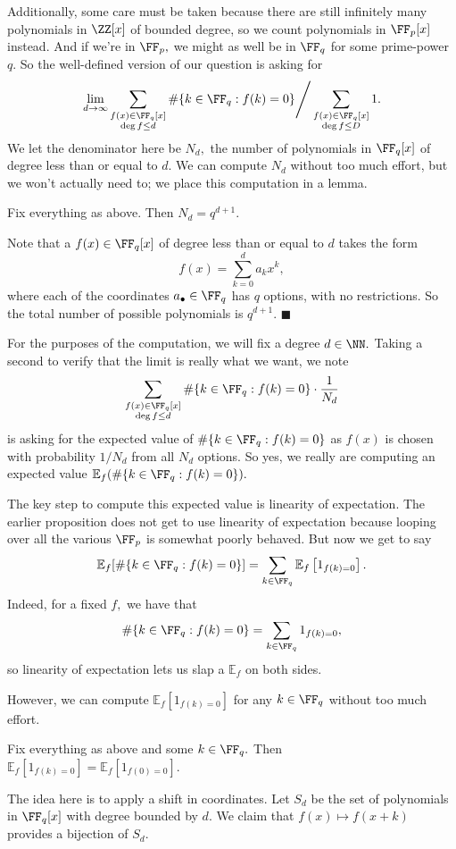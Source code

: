 Additionally, some care must be taken because there are still infinitely many polynomials in $\ZZ[x]$ of bounded degree, so we count polynomials in $\FF_p[x]$ instead. And if we're in $\FF_p,$ we might as well be in $\FF_q$ for some prime-power $q.$ So the well-defined version of our question is asking for
\[\lim_{d\to\infty}\sum_{\substack{f(x)\in\FF_q[x]\\\deg f\le d}}\#\{k\in\FF_q:f(k)=0\}\Bigg/\sum_{\substack{f(x)\in\FF_q[x]\\\deg f\le D}}1.\]
We let the denominator here be $N_d,$ the number of polynomials in $\FF_q[x]$ of degree less than or equal to $d.$ We can compute $N_d$ without too much effort, but we won't actually need to; we place this computation in a lemma.
\begin{lemma}
    Fix everything as above. Then $N_d=q^{d+1}.$
\end{lemma}
Note that a $f(x)\in\FF_q[x]$ of degree less than or equal to $d$ takes the form
\[f(x)=\sum_{k=0}^da_kx^k,\]
where each of the coordinates $a_\bullet\in\FF_q$ has $q$ options, with no restrictions. So the total number of possible polynomials is $q^{d+1}.$ $\blacksquare$

For the purposes of the computation, we will fix a degree $d\in\NN.$ Taking a second to verify that the limit is really what we want, we note
\[\sum_{\substack{f(x)\in\FF_q[x]\\\deg f\le d}}\#\{k\in\FF_q:f(k)=0\}\cdot\frac1{N_d}\]
is asking for the expected value of $\#\{k\in\FF_q:f(k)=0\}$ as $f(x)$ is chosen with probability $1/N_d$ from all $N_d$ options. So yes, we really are computing an expected value $\mathbb E_f(\#\{k\in\FF_q:f(k)=0\}).$

The key step to compute this expected value is linearity of expectation. The earlier proposition does not get to use linearity of expectation because looping over all the various $\FF_p$ is somewhat poorly behaved. But now we get to say
\[\mathbb E_f[\#\{k\in\FF_q:f(k)=0\}]=\sum_{k\in\FF_q}\mathbb E_f\left[1_{f(k)=0}\right].\]
Indeed, for a fixed $f,$ we have that
\[\#\{k\in\FF_q:f(k)=0\}=\sum_{k\in\FF_q}1_{f(k)=0},\]
so linearity of expectation lets us slap a $\mathbb E_f$ on both sides.

However, we can compute $\mathbb E_f\left[1_{f(k)=0}\right]$ for any $k\in\FF_q$ without too much effort.
\begin{lemma}
    Fix everything as above and some $k\in\FF_q.$ Then $\mathbb E_f\left[1_{f(k)=0}\right]=\mathbb E_f\left[1_{f(0)=0}\right].$
\end{lemma}
The idea here is to apply a shift in coordinates. Let $S_d$ be the set of polynomials in $\FF_q[x]$ with degree bounded by $d.$ We claim that $f(x)\mapsto f(x+k)$ provides a bijection of $S_d.$

